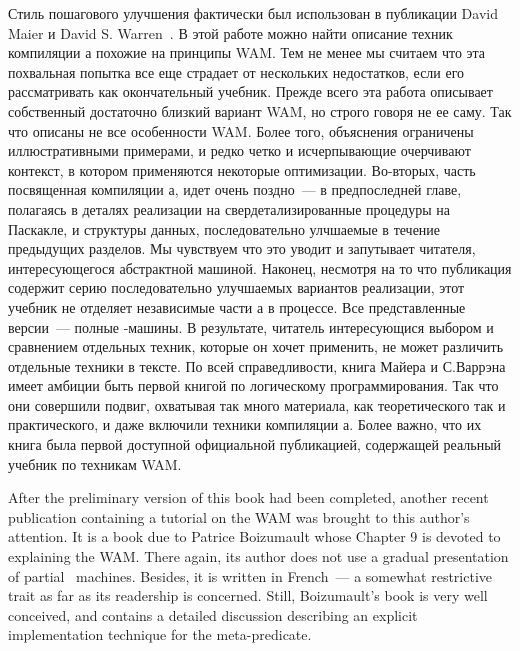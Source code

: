 Стиль пошагового улучшения фактически был использован в публикации David Maier и
David S. Warren\ \cite{MW88}. В этой работе можно найти описание техник компиляции
\prolog а похожие на принципы WAM. Тем не менее мы считаем что
эта похвальная попытка все еще страдает от нескольких недостатков, если его
рассматривать как окончательный учебник.
Прежде всего эта работа описывает собственный достаточно близкий вариант WAM, но
строго говоря не ее саму. Так что описаны не все особенности WAM.
Более того, объяснения ограничены иллюстративными примерами, и редко четко и
исчерпывающие очерчивают контекст, в котором применяются некоторые оптимизации.
Во-вторых, часть посвященная компиляции \prolog а, идет очень поздно\ --- в
предпоследней главе, полагаясь в деталях реализации на свердетализированные
процедуры на Паскакле, и структуры данных, последовательно улчшаемые в течение
предыдущих разделов. Мы чувствуем что это уводит и запутывает читателя,
интересующегося абстрактной машиной. Наконец, несмотря на то что публикация
содержит серию последовательно улучшаемых вариантов реализации, этот учебник не
отделяет независимые части \prolog а в процессе. Все представленные версии\ ---
полные \prolog-машины. В результате, читатель интересующися выбором и сравнением
отдельных техник, которые он хочет применить, не может различить отдельные
техники в тексте. По всей справедливости, книга Майера и С.Варрэна имеет амбиции
быть первой книгой по логическому программирования. Так что они совершили
подвиг, охватывая так много материала, как теоретического так и практического, и
даже включили техники компиляции \prolog а. Более важно, что их книга была
первой доступной официальной публикацией, содержащей реальный учебник по
техникам WAM.

After the preliminary version of this book had been completed, another recent
publication containing a tutorial on the WAM was brought to this author’s
attention. It is a book due to Patrice Boizumault \cite{Boi88} whose Chapter 9
is devoted to explaining the WAM. There again, its author does not use a gradual
presentation of partial \prolog\ machines. Besides, it is written in French\ ---
a somewhat restrictive trait as far as its readership is concerned. Still,
Boizumault’s book is very well conceived, and contains a detailed discussion
describing an explicit implementation technique for the 
meta-predicate.

